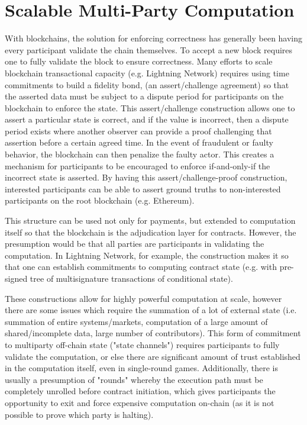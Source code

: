 \documentclass[letterpaper, 11pt]{article}
\begin{document}
\section{Scalable Multi-Party Computation}

With blockchains, the solution for enforcing correctness has generally been
having every participant validate the chain themselves. To accept a new block
requires one to fully validate the block to ensure correctness. Many efforts to
scale blockchain transactional capacity (e.g. Lightning
Network\cite{Lightning}) requires using time commitments to build a fidelity
bond, (an assert/challenge agreement) so that the asserted data must be subject
to a dispute period for participants on the blockchain to enforce the state.
This assert/challenge construction allows one to assert a particular state is
correct, and if the value is incorrect, then a dispute period exists where
another observer can provide a proof challenging that assertion before a
certain agreed time. In the event of fraudulent or faulty behavior, the
blockchain can then penalize the faulty actor. This creates a mechanism for
participants to be encouraged to enforce if-and-only-if the incorrect state is
asserted. By having this assert/challenge-proof construction, interested
participants can be able to assert ground truths to non-interested participants
on the root blockchain (e.g.
Ethereum\cite{ethereumwhite}\cite{ethereumyellow}).

This structure can be used not only for payments, but extended to computation
itself so that the blockchain is the adjudication layer for contracts. However,
the presumption would be that all parties are participants in validating the
computation. In Lightning Network, for example, the construction makes it so
that one can establish commitments to computing contract state (e.g. with
pre-signed tree of multisignature transactions of conditional state).

These constructions allow for highly powerful computation at scale, however
there are some issues which require the summation of a lot of external state
(i.e. summation of entire systems/markets, computation of a large amount of
shared/incomplete data, large number of contributors). This form of commitment
to multiparty off-chain state ("state channels"\cite{raiden}) requires
participants to fully validate the computation, or else there are significant
amount of trust established in the computation itself, even in single-round
games. Additionally, there is usually a presumption of "rounds" whereby the
execution path must be completely unrolled before contract initiation, which
gives participants the opportunity to exit and force expensive computation
on-chain (as it is not possible to prove which party is halting).
\end{document}
